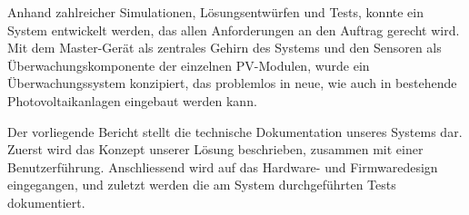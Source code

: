 Anhand zahlreicher  Simulationen, L\"osungsentw\"urfen  und Tests,  konnte ein
System  entwickelt werden,  das  allen Anforderungen  an  den Auftrag  gerecht
wird. Mit  dem  Master-Ger\"at  als  zentrales  Gehirn  des  Systems  und  den
Sensoren  als \"Uberwachungskomponente  der  einzelnen  PV-Modulen, wurde  ein
\"Uberwachungssystem  konzipiert,   das  problemlos  in  neue,   wie  auch  in
bestehende Photovoltaikanlagen eingebaut werden kann.


Der vorliegende  Bericht stellt  die technische Dokumentation  unseres Systems
dar.  Zuerst wird das Konzept unserer L\"osung beschrieben, zusammen mit einer
Benutzerf\"uhrung.  Anschliessend  wird auf  das Hardware-  und Firmwaredesign
eingegangen,  und   zuletzt  werden  die  am   System  durchgef\"uhrten  Tests
dokumentiert.
